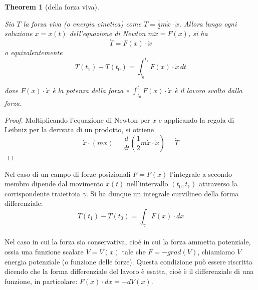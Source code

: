 \documentclass{article}
\newtheorem{theorem}{Theorem}[section]
\begin{document}
            \begin{theorem}[della forza viva]
                \label{thm:Forza viva}

                Sia $T$ la forza viva (o energia cinetica) come $T = \frac{1}{2}m \dot{x} \cdot \dot{x}$.
                Allora lungo ogni soluzione $x = x(t)$ dell'equazione di Newton $m \ddot{x} = F(x)$, si ha 
                \[ \dot{T} = F(x) \cdot \dot{x} \] o equivalentemente \[ T(t_1) - T(t_0) = \int_{t_0}^{t_1} F(x) \cdot \dot{x} \, dt \]

                dove $F(x) \cdot \dot{x}$ è la potenza della forza e $\int_{t_0}^{t_1} F(x) \cdot \dot{x}$ è il lavoro svolto dalla forza. 

            \end{theorem}
            \begin{proof}

                Moltiplicando l'equazione di Newton per $\dot{x}$ e applicando la regola di Leibniz per la derivata di un prodotto, si ottiene
                \[ \dot{x} \cdot (m \ddot{x}) = \frac{d}{dt}(\frac{1}{2} m \dot{x} \cdot \dot{x}) = \dot{T} \]

            \end{proof} 

            Nel caso di un campo di forze posizionali $F = F(x)$ l'integrale a secondo membro dipende dal movimento $x(t)$ nell'intervallo $(t_0, t_1)$ 
            attraverso la corrispondente traiettoia $\gamma$. Si ha dunque un integrale curvilineo della forma differenziale: 
            \[ T(t_1) - T(t_0) = \int_{\gamma} F(x) \cdot dx \]  \\
            Nel caso in cui la forza sia conservativa, cioè in cui la forza ammetta potenziale, ossia una funzione scalare $V = V(x)$ tale che $F = - grad(V)$, 
            chiamiamo $V$ energia potenziale (o funzione delle forze). Questa condizione può essere riscritta dicendo che la forma differenziale del lavoro 
            è esatta, cioè è il differenziale di una funzione, in particolare: $F(x) \cdot dx = -dV(x)$. \\
\end{document}
